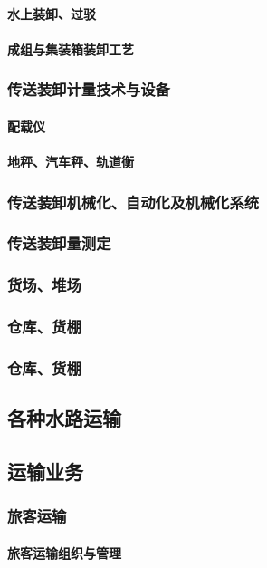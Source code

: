 \documentclass[UTF8]{../ApplicationUniverse}
\begin{document}
            \paragraph{水上装卸、过驳}
            \paragraph{成组与集装箱装卸工艺}
        \subsubsection{传送装卸计量技术与设备}
            \paragraph{配载仪}
            \paragraph{地秤、汽车秤、轨道衡}
        \subsubsection{传送装卸机械化、自动化及机械化系统}
        \subsubsection{传送装卸量测定}
        \subsubsection{货场、堆场}
        \subsubsection{仓库、货棚}
        \subsubsection{仓库、货棚}
    \subsection{各种水路运输}
    \subsection{运输业务}
        \subsubsection{旅客运输}
            \paragraph{旅客运输组织与管理}
\end{document}
